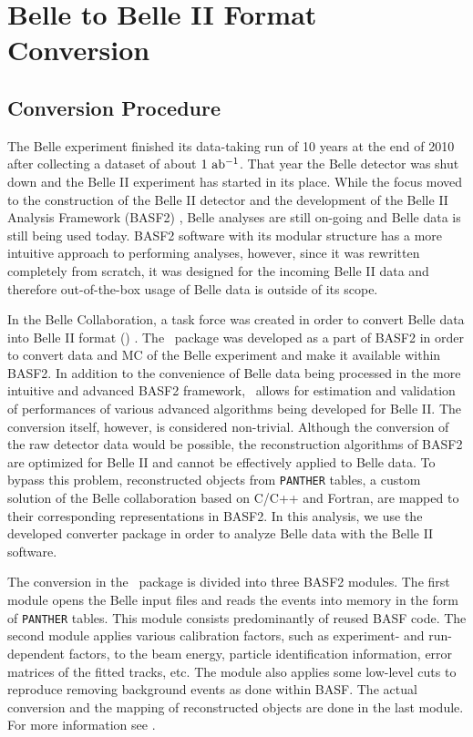 \chapter{Belle to Belle II Format Conversion}

\section{Conversion Procedure}
The Belle experiment finished its data-taking run of 10 years at the end of 2010 after collecting a dataset of about $1\mathrm{~ab^{-1}}$. That year the Belle detector was shut down and the Belle II experiment has started in its place. While the focus moved to the construction of the Belle II detector and the development of the Belle II Analysis Framework (BASF2) \cite{Kuhr:2018lps}, Belle analyses are still on-going and Belle data is still being used today. BASF2 software with its modular structure has a more intuitive approach to performing analyses, however, since it was rewritten completely from scratch, it was designed for the incoming Belle II data and therefore out-of-the-box usage of Belle data is outside of its scope.

In the Belle Collaboration, a task force was created in order to convert Belle data into Belle II format (\btbii) \cite{Keck:b2bii2018}. The \btbii~package was developed as a part of BASF2 in order to convert data and MC of the Belle experiment and make it available within BASF2. In addition to the convenience of Belle data being processed in the more intuitive and advanced BASF2 framework, \btbii~allows for estimation and validation of performances of various advanced algorithms being developed for Belle II. The conversion itself, however, is considered non-trivial. Although the conversion of the raw detector data would be possible, the reconstruction algorithms of BASF2 are optimized for Belle II and cannot be effectively applied to Belle data. To bypass this problem, reconstructed objects from \texttt{PANTHER} tables, a custom solution of the Belle collaboration based on C/C++ and Fortran, are mapped to their corresponding representations in BASF2. In this analysis, we use the developed converter package in order to analyze Belle data with the Belle II software.

The conversion in the \btbii~package is divided into three BASF2 modules. The first module opens the Belle input files and reads the events into memory in the form of \texttt{PANTHER} tables. This module consists predominantly of reused BASF code. The second module applies various calibration factors, such as experiment- and run-dependent factors, to the beam energy, particle identification information, error matrices of the fitted tracks, etc. The module also applies some low-level cuts to reproduce removing background events as done within BASF. The actual conversion and the mapping of reconstructed objects are done in the last module. For more information see \cite{Keck:48940}.

